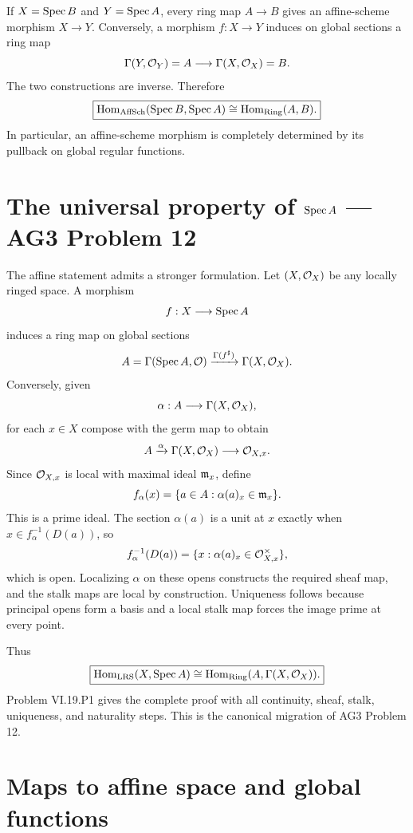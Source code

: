 If $X=\operatorname{Spec} B$ and $Y=\operatorname{Spec} A$, every ring map $A\to B$ gives an affine-scheme morphism
$X\to Y$.  Conversely, a morphism $f:X\to Y$ induces on global sections a ring map
\[
\Gamma(Y,\mathcal O_Y)=A\longrightarrow\Gamma(X,\mathcal O_X)=B.
\]
The two constructions are inverse.  Therefore
\[
\boxed{
\operatorname{Hom}_{\mathrm{AffSch}}(\operatorname{Spec} B,\operatorname{Spec} A)
\cong
\operatorname{Hom}_{\mathrm{Ring}}(A,B).
}
\]
In particular, an affine-scheme morphism is completely determined by its pullback on global
regular functions.



\section{The universal property of \texorpdfstring{$\operatorname{Spec} A$}{Spec A} --- AG3 Problem 12}

The affine statement admits a stronger formulation.  Let $(X,\mathcal O_X)$ be any locally ringed
space.  A morphism
\[
f:X\longrightarrow\operatorname{Spec} A
\]
induces a ring map on global sections
\[
A=\Gamma(\operatorname{Spec} A,\mathcal O)\xrightarrow{\Gamma(f^\sharp)}\Gamma(X,\mathcal O_X).
\]
Conversely, given
\[
\alpha:A\longrightarrow\Gamma(X,\mathcal O_X),
\]
for each $x\in X$ compose with the germ map to obtain
\[
A\xrightarrow{\alpha}\Gamma(X,\mathcal O_X)\longrightarrow\mathcal O_{X,x}.
\]
Since $\mathcal O_{X,x}$ is local with maximal ideal $\mathfrak m_x$, define
\[
f_\alpha(x)=\{a\in A:\alpha(a)_x\in\mathfrak m_x\}.
\]
This is a prime ideal.  The section $\alpha(a)$ is a unit at $x$ exactly when
$x\in f_\alpha^{-1}(D(a))$, so
\[
f_\alpha^{-1}(D(a))
=
\{x:\alpha(a)_x\in\mathcal O_{X,x}^{\times}\},
\]
which is open.  Localizing $\alpha$ on these opens constructs the required sheaf map, and
the stalk maps are local by construction.  Uniqueness follows because principal opens form a
basis and a local stalk map forces the image prime at every point.

Thus
\[
\boxed{
\operatorname{Hom}_{\mathrm{LRS}}(X,\operatorname{Spec} A)
\cong
\operatorname{Hom}_{\mathrm{Ring}}(A,\Gamma(X,\mathcal O_X)).
}
\]
Problem VI.19.P1 gives the complete proof with all continuity, sheaf, stalk, uniqueness, and
naturality steps.  This is the canonical migration of AG3 Problem 12.



\section{Maps to affine space and global functions}

